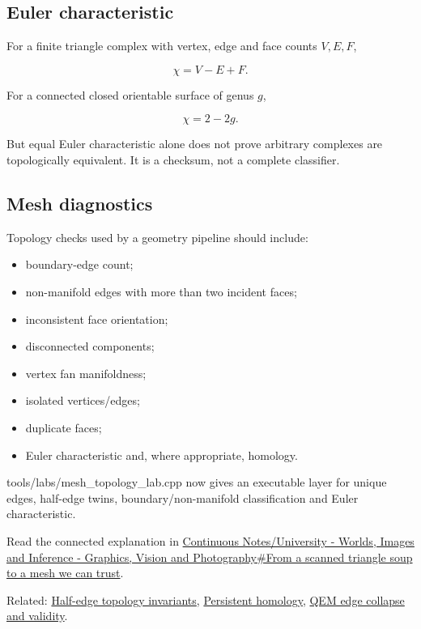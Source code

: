 \subsection{Euler characteristic}\label{appendix-e38976cbbf86-euler-characteristic}

For a finite triangle complex with vertex, edge and face counts \(V,E,F\),

\[
\chi=V-E+F.
\]

For a connected closed orientable surface of genus \(g\),

\[
\chi=2-2g.
\]

But equal Euler characteristic alone does not prove arbitrary complexes are topologically equivalent. It is a checksum, not a complete classifier.

\subsection{Mesh diagnostics}\label{appendix-e38976cbbf86-mesh-diagnostics}

Topology checks used by a geometry pipeline should include:

\begin{itemize}
\tightlist
\item
  boundary-edge count;
\item
  non-manifold edges with more than two incident faces;
\item
  inconsistent face orientation;
\item
  disconnected components;
\item
  vertex fan manifoldness;
\item
  isolated vertices/edges;
\item
  duplicate faces;
\item
  Euler characteristic and, where appropriate, homology.
\end{itemize}

tools/labs/mesh\_topology\_lab.cpp now gives an executable layer for unique edges, half-edge twins, boundary/non-manifold classification and Euler characteristic.

Read the connected explanation in \hyperref[03-visual-computing-i-ch002-from-a-scanned-triangle-soup-to-a-mesh-we-can-trust]{Continuous Notes/University - Worlds, Images and Inference - Graphics, Vision and Photography\#From a scanned triangle soup to a mesh we can trust}.

Related: \hyperref[appendix-faac749c9cdd]{Half-edge topology invariants}, \hyperref[appendix-e4d8ed8d6787]{Persistent homology}, \hyperref[appendix-89db9fe1bc8a]{QEM edge collapse and validity}.
